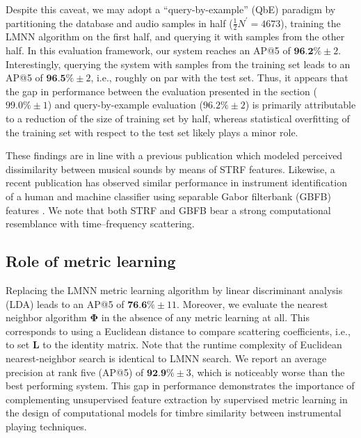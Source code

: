 \documentclass{bmcart}
\newcommand{\ja}[1]{\textcolor{purple}{JA: #1}\xspace}
\newcommand{\lnameref}[1]{%
\bgroup
\let\nmu\MakeLowercase
\nameref{#1}\egroup}
\newcommand{\nmu}{}
\begin{document}
Despite this caveat, we may adopt a ``query-by-example'' (QbE) paradigm by  partitioning the database and audio samples in half ($\frac{1}{2}N^{\prime}=4673$), training the LMNN algorithm on the first half, and querying it with samples from the other half.
In this evaluation framework, our system reaches an AP@5 of $\textbf{96.2\%} \pm 2$.
Interestingly, querying the system with samples from the training set leads to an AP@5 of $\textbf{96.5\%} \pm 2$, i.e., roughly on par with the test set.
Thus, it appears that the gap in performance between the evaluation presented in the \lnameref{sec:results} section ($99.0\%\pm 1$) and query-by-example evaluation ($96.2\% \pm 2$) is primarily attributable to a reduction of the size of training set by half, whereas statistical overfitting of the training set with respect to the test set likely plays a minor role.

These findings are in line with a previous publication \cite{patil2012ploscompbiol} which modeled perceived dissimilarity between musical sounds by means of STRF features.
Likewise, a recent publication has observed similar performance in instrument identification of a human and machine classifier using separable Gabor filterbank (GBFB) features \cite{siedenburg2019jasa}.
We note that both STRF and GBFB bear a strong computational resemblance with time--frequency scattering.



\subsection*{Role of metric learning}
Replacing the LMNN metric learning algorithm by linear discriminant analysis (LDA) leads to an AP@5 of $\textbf{76.6}\% \pm 11$.
Moreover, we evaluate the nearest neighbor algorithm $\mathbf{\Phi}$ in the absence of any metric learning at all. %
This corresponds to using a Euclidean distance to compare scattering coefficients, i.e., to set $\mathbf{L}$ to the identity matrix.
Note that the runtime complexity of Euclidean nearest-neighbor search is identical to LMNN search. %
We report an average precision at rank five (AP@5) of $\textbf{92.9\%} \pm 3$, which is noticeably worse than the best performing system.
This gap in performance demonstrates the importance of complementing unsupervised feature extraction by supervised metric learning in the design  of computational models for timbre similarity between instrumental playing techniques.
\end{document}
